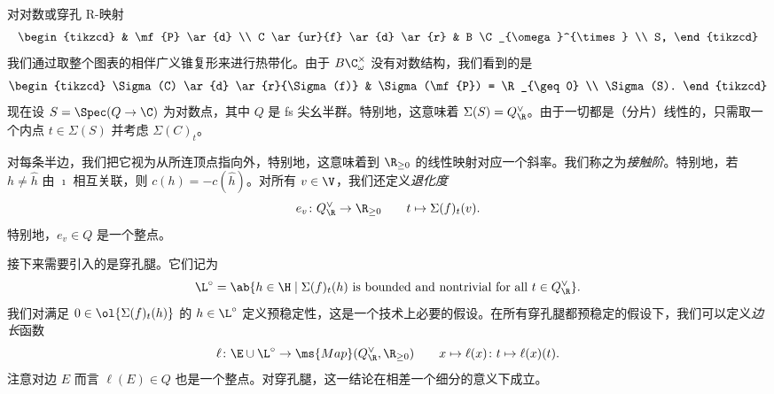 \begin{exm}
\begin{center}
    \end{center}
\end{exm}

对对数或穿孔 R-映射
\begin{equation*}
\begin{tikzcd}
    & \mf{P} \ar{d} \\
    C \ar{ur}{f} \ar{d} \ar{r} & B \C_{\omega}^{\times} \\
    S,
\end{tikzcd}
\end{equation*}
我们通过取整个图表的相伴广义锥复形来进行热带化。由于 \(B \C_{\omega}^{\times}\) 没有对数结构，我们看到的是
\begin{equation*}
\begin{tikzcd}
    \Sigma(C) \ar{d} \ar{r}{\Sigma(f)} & \Sigma(\mf{P}) = \R_{\geq 0} \\
    \Sigma(S).
\end{tikzcd}
\end{equation*}
现在设 \(S = \Spec (Q \to \C)\) 为对数点，其中 \(Q\) 是 fs 尖幺半群。特别地，这意味着 \(\Sigma(S) = Q_{\R}^{\vee}\)。由于一切都是（分片）线性的，只需取一个内点 \(t \in \Sigma(S)\) 并考虑 \(\Sigma(C)_t\)。

对每条半边，我们把它视为从所连顶点指向外，特别地，这意味着到 \(\R_{\geq 0}\) 的线性映射对应一个斜率。我们称之为\textit{接触阶}。特别地，若 \(h \neq \hat{h}\) 由 \(\imath\) 相互关联，则 \(c(h) = - c(\hat{h})\)。对所有 \(v \in \V\)，我们还定义\textit{退化度}
\[ e_v \colon Q_{\R}^{\vee} \to \R_{\geq 0} \qquad t \mapsto \Sigma(f)_t (v). \]
特别地，\(e_v \in Q\) 是一个整点。

接下来需要引入的是穿孔腿。它们记为
\[ \L^{\circ} = \ab\{ h \in \H \mid \Sigma(f)_t(h) \text{ is bounded and nontrivial for all } t \in Q_{\R}^{\vee}\}. \] 
我们对满足 \(0 \in \ol{\Sigma(f)_t(h)}\) 的 \(h \in \L^{\circ}\) 定义预稳定性，这是一个技术上必要的假设。在所有穿孔腿都预稳定的假设下，我们可以定义\textit{边长}函数
\[ \ell \colon \E \cup \L^{\circ} \to \ms{Map}(Q_{\R}^{\vee}, \R_{\geq 0}) \qquad x \mapsto \ell(x) \colon t \mapsto \ell(x)(t). \]
注意对边 \(E\) 而言 \(\ell(E) \in Q\) 也是一个整点。对穿孔腿，这一结论在相差一个细分的意义下成立。

